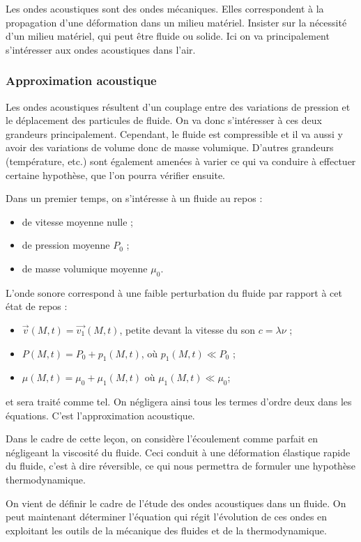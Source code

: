 Les ondes acoustiques sont des ondes mécaniques.
Elles correspondent à la propagation d'une déformation dans un milieu matériel.
Insister sur la nécessité d'un milieu matériel, qui peut être fluide ou solide.
Ici on va principalement s'intéresser aux ondes acoustiques dans l'air.

\subsubsection{Approximation acoustique}

Les ondes acoustiques résultent d'un couplage entre des variations de pression et le déplacement des particules de fluide.
On va donc s'intéresser à ces deux grandeurs principalement.
Cependant, le fluide est compressible et il va aussi y avoir des variations de volume donc de masse volumique.
D'autres grandeurs (température, etc.) sont également amenées à varier ce qui va conduire à effectuer certaine hypothèse, que l'on pourra vérifier ensuite.

Dans un premier temps, on s'intéresse à un fluide au repos :
\begin{itemize}
\item de vitesse moyenne nulle ;
\item de pression moyenne $P_0$ ;
\item de masse volumique moyenne $\mu_0$.
\end{itemize}

L'onde sonore correspond à une faible perturbation du fluide par rapport à cet état de repos :
\begin{itemize}
\item $\overrightarrow{v}(M, t) = \overrightarrow{v_1}(M, t)$, petite devant la vitesse du son $c=\lambda\nu$ ;
\item $P(M, t) = P_0 + p_1(M, t)$, où $p_1(M, t) \ll P_0$ ;
\item $\mu(M, t) = \mu_0 + \mu_1(M,t)$ où $\mu_1(M, t) \ll \mu_0$;
\end{itemize}
et sera traité comme tel.
On négligera ainsi tous les termes d'ordre deux dans les équations.
C'est l'approximation acoustique.

Dans le cadre de cette leçon, on considère l'écoulement comme parfait en négligeant la viscosité du fluide.
Ceci conduit à une déformation élastique rapide du fluide, c'est à dire réversible, ce qui nous permettra de formuler une hypothèse thermodynamique.

\begin{transition}
On vient de définir le cadre de l'étude des ondes acoustiques dans un fluide.
On peut maintenant déterminer l'équation qui régit l'évolution de ces ondes en exploitant les outils de la mécanique des fluides et de la thermodynamique.
\end{transition}

